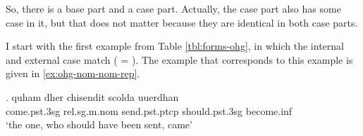 So, there is a base part and a case part. Actually, the case part also has some case in it, but that does not matter because they are identical in both case parts.

I start with the first example from Table \ref{tbl:forms-ohg}, in which the internal and external case match ( = ). The example that corresponds to this example is given in \ref{ex:ohg-nom-nom-rep}.

\exg. quham dher chisendit scolda uuerdhan\\
 come.\ac{pst}.3\ac{sg}\scsub{[nom]} \ac{rel}.\ac{sg}.\ac{m}.\ac{nom} send.\ac{pst}.\ac{ptcp}\scsub{[nom]} should.\ac{pst}.3\ac{sg} become.\ac{inf}\\
 `the one, who should have been sent, came' \label{ex:ohg-nom-nom-rep-workout}


